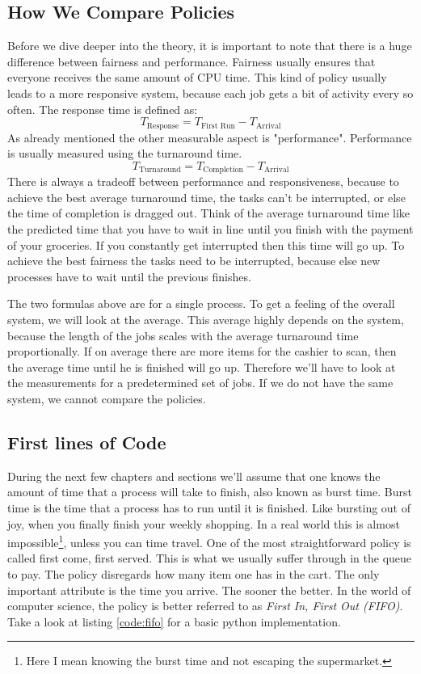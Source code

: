 \subsection{How We Compare Policies}

Before we dive deeper into the theory, it is important to note that there is a huge difference between fairness and performance.
Fairness usually ensures that everyone receives the same amount of CPU time.
This kind of policy usually leads to a more responsive system, because each job gets a bit of activity every so often.
The response time is defined as:
$$T_{\text{Response}} = T_{\text{First Run}} - T_{\text{Arrival}}$$
As already mentioned the other measurable aspect is "performance".
Performance is usually measured using the turnaround time.
$$T_{\text{Turnaround}} = T_{\text{Completion}} - T_{\text{Arrival}}$$
There is always a tradeoff between performance and responsiveness, because to achieve the best average turnaround time, the tasks can't be interrupted, or else the time of completion is dragged out.
Think of the average turnaround time like the predicted time that you have to wait in line until you finish with the payment of your groceries. If you constantly get interrupted then this time will go up.
To achieve the best fairness the tasks need to be interrupted, because else new processes have to wait until the previous finishes.

The two formulas above are for a single process. To get a feeling of the overall system, we will look at the average. This average highly depends on the system, because the length of the jobs scales with the average turnaround time proportionally.
If on average there are more items for the cashier to scan, then the average time until he is finished will go up.
Therefore we’ll have to look at the measurements for a predetermined set of jobs.
If we do not have the same system, we cannot compare the policies.

\subsection{First lines of Code} \label{sec:first-lines-of-code}

During the next few chapters and sections we'll assume that one knows the amount of time that a process will take to finish, also known as burst time.
Burst time is the time that a process has to run until it is finished.
Like bursting out of joy, when you finally finish your weekly shopping.
In a real world this is almost impossible\footnote{Here I mean knowing the burst time and not escaping the supermarket.}, unless you can time travel.
One of the most straightforward policy is called first come, first served.
This is what we usually suffer through in the queue to pay.
The policy disregards how many item one has in the cart.
The only important attribute is the time you arrive.
The sooner the better.
In the world of computer science, the policy is better referred to as \emph{First In, First Out (FIFO)}.
Take a look at listing \ref{code:fifo} for a basic python implementation.

